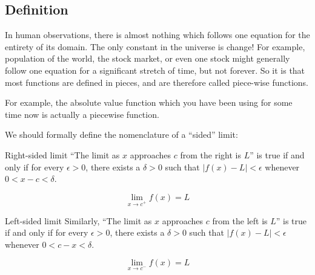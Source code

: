 
\subsection{Definition}



In human observations, there is almost nothing which follows one equation for the 
entirety of its domain.  The only constant in the universe is change!  For example, 
population of the world, the stock market, or even one stock might generally follow one
equation for a significant stretch of time, but not forever.  So it is that most functions are 
defined in pieces, and are therefore called piece-wise functions.

For example, the absolute value function which you have been using for some time now is
actually a piecewise function.

We should formally define the nomenclature of a ``sided'' limit:

\begin{derivation}{Right-sided limit}
``The limit as $x$ approaches $c$ from the right is $L$'' is true if and only if for every $\epsilon > 0$, there exists a $\delta > 0$ such that
$|f(x)-L|<\epsilon$ whenever $0<x-c<\delta$.

$$\lim_{x \to c^+}f(x) = L$$
\end{derivation}


\begin{derivation}{Left-sided limit}
Similarly, ``The limit as $x$ approaches $c$ from the left is $L$'' is true if and only if for every $\epsilon > 0$, there exists a $\delta > 0$ such that
$|f(x)-L|<\epsilon$ whenever $0<c-x<\delta$.

$$\lim_{x \to c^-}f(x) = L$$
\end{derivation}



